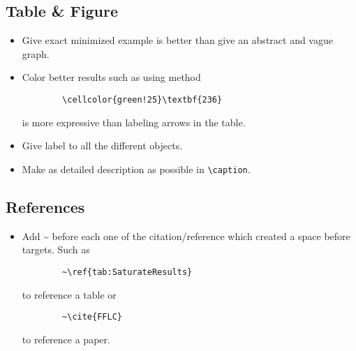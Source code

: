 \documentclass[acmsmall,screen,review]{acmart}
\begin{document}
\subsection{Table \& Figure}
\begin{itemize}
    \item Give exact minimized example is better than give an abstract and vague graph.
    \item Color better results such as using method
    \begin{verbatim}
        \cellcolor{green!25}\textbf{236}
    \end{verbatim}
    \vspace{-\baselineskip}
    is more expressive than labeling arrows in the table.
    \item Give label to all the different objects.
    \item Make as detailed description as possible in \verb+\caption+.
\end{itemize}

\subsection{References}
\begin{itemize}
    \item Add \textasciitilde{ } before each one of the citation/reference which created a space before targets. Such as
    \begin{verbatim}
        ~\ref{tab:SaturateResults}
    \end{verbatim}
    \vspace{-\baselineskip}
    to reference a table or
    \begin{verbatim}
        ~\cite{FFLC}
    \end{verbatim}
    \vspace{-\baselineskip}
    to reference a paper.
    
\end{itemize}
\end{document}
